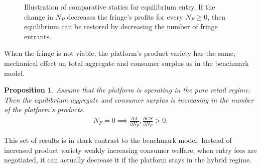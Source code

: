 \documentclass[a4paper]{article}
\newtheorem{proposition}{Proposition}
\begin{document}
\begin{figure}[ht]
    \centering
    \caption{Illustration of comparative statics for equilibrium entry. If the change in $N_P$ decreases the fringe's profits for every $N_F \geq 0$, then equilibrium can be restored by decreasing the number of fringe entrants.}
    \label{fig:comparative_N_F}
\end{figure}

When the fringe is not viable, the platform's product variety has the same, mechanical effect on total aggregate and consumer surplus as in the benchmark model.
\begin{proposition}
    Assume that the platform is operating in the pure retail regime. Then the equilibrium aggregate and consumer surplus is increasing in the number of the platform's products.
    \begin{align*}
        N_F = 0 \implies \frac{\partial A}{\partial N_P}, \frac{\partial CS}{\partial N_P} > 0.
    \end{align*}
\end{proposition}
This set of results is in stark contrast to the benchmark model.
Instead of increased product variety weakly increasing consumer welfare, when entry fees are negotiated, it can actually decrease it if the platform stays in the hybrid regime.
\end{document}
